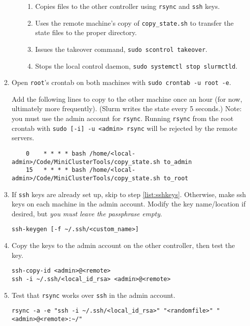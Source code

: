 \begin{enumerate}
\begin{itemize}
\begin{enumerate}
		\item Copies files to the other controller using \texttt{rsync} and \texttt{ssh} keys.

		\item Uses the remote machine's copy of \texttt{copy\_state.sh} to transfer the state files to the proper directory.

		\item Issues the takeover command, \texttt{sudo scontrol takeover}.

		\item Stops the local control daemon, \texttt{sudo systemctl stop slurmctld}.
		\end{enumerate}

	\end{itemize}

\item Open \texttt{root}'s crontab on both machines with \texttt{sudo crontab -u root -e}.

	Add the following lines to copy to the other machine once an hour (for now, ultimately more frequently). (Slurm writes the state every 5 seconds.) Note: you must use the admin account for \texttt{rsync}. Running \texttt{rsync} from the root crontab with \texttt{sudo [-i] -u <admin> rsync} will be rejected by the remote servers.
	\begin{verbatim}
	0    * * * * bash /home/<local-admin>/Code/MiniClusterTools/copy_state.sh to_admin
	15   * * * * bash /home/<local-admin>/Code/MiniClusterTools/copy_state.sh to_root
	\end{verbatim}

\item If \texttt{ssh} keys are already set up, skip to step \ref{list:sshkeys}. Otherwise, make ssh keys on each machine in the admin account. Modify the key name/location if desired, but \emph{you must leave the passphrase empty}. 

	\texttt{ssh-keygen [-f \textasciitilde /.ssh/<custom\_name>]}

\item Copy the keys to the admin account on the other controller, then test the key.

	\texttt{ssh-copy-id <admin>@<remote>} \\
	\texttt{ssh -i \textasciitilde /.ssh/<local\_id\_rsa> <admin>@<remote>}

\item Test that \texttt{rsync} works over \texttt{ssh} in the admin account.

	\texttt{rsync -a -e "ssh -i \textasciitilde /.ssh/<local\_id\_rsa>" "<randomfile>" "<admin>@<remote>:\textasciitilde /"}


\end{enumerate}

